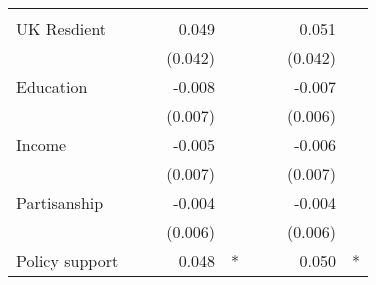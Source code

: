 \documentclass{article}
\begin{document}
\begin{table}[!h]
\begin{tabular}{lllllllll}
  \multicolumn{1}{l}{} \\
\multicolumn{1}{l}{UK Resdient} &
  \multicolumn{1}{r}{} &
  \multicolumn{1}{l}{} &
  \multicolumn{1}{r}{0.049} &
  \multicolumn{1}{l}{} &
  \multicolumn{1}{r}{} &
  \multicolumn{1}{l}{} &
  \multicolumn{1}{r}{0.051} &
  \multicolumn{1}{l}{} \\
\multicolumn{1}{l}{} &
  \multicolumn{1}{r}{} &
  \multicolumn{1}{l}{} &
  \multicolumn{1}{r}{(0.042)} &
  \multicolumn{1}{l}{} &
  \multicolumn{1}{r}{} &
  \multicolumn{1}{l}{} &
  \multicolumn{1}{r}{(0.042)} &
  \multicolumn{1}{l}{} \\
\multicolumn{1}{l}{Education} &
  \multicolumn{1}{r}{} &
  \multicolumn{1}{l}{} &
  \multicolumn{1}{r}{-0.008} &
  \multicolumn{1}{l}{} &
  \multicolumn{1}{r}{} &
  \multicolumn{1}{l}{} &
  \multicolumn{1}{r}{-0.007} &
  \multicolumn{1}{l}{} \\
\multicolumn{1}{l}{} &
  \multicolumn{1}{r}{} &
  \multicolumn{1}{l}{} &
  \multicolumn{1}{r}{(0.007)} &
  \multicolumn{1}{l}{} &
  \multicolumn{1}{r}{} &
  \multicolumn{1}{l}{} &
  \multicolumn{1}{r}{(0.006)} &
  \multicolumn{1}{l}{} \\
\multicolumn{1}{l}{Income} &
  \multicolumn{1}{r}{} &
  \multicolumn{1}{l}{} &
  \multicolumn{1}{r}{-0.005} &
  \multicolumn{1}{l}{} &
  \multicolumn{1}{r}{} &
  \multicolumn{1}{l}{} &
  \multicolumn{1}{r}{-0.006} &
  \multicolumn{1}{l}{} \\
\multicolumn{1}{l}{} &
  \multicolumn{1}{r}{} &
  \multicolumn{1}{l}{} &
  \multicolumn{1}{r}{(0.007)} &
  \multicolumn{1}{l}{} &
  \multicolumn{1}{r}{} &
  \multicolumn{1}{l}{} &
  \multicolumn{1}{r}{(0.007)} &
  \multicolumn{1}{l}{} \\
\multicolumn{1}{l}{Partisanship} &
  \multicolumn{1}{r}{} &
  \multicolumn{1}{l}{} &
  \multicolumn{1}{r}{-0.004} &
  \multicolumn{1}{l}{} &
  \multicolumn{1}{r}{} &
  \multicolumn{1}{l}{} &
  \multicolumn{1}{r}{-0.004} &
  \multicolumn{1}{l}{} \\
\multicolumn{1}{l}{} &
  \multicolumn{1}{r}{} &
  \multicolumn{1}{l}{} &
  \multicolumn{1}{r}{(0.006)} &
  \multicolumn{1}{l}{} &
  \multicolumn{1}{r}{} &
  \multicolumn{1}{l}{} &
  \multicolumn{1}{r}{(0.006)} &
  \multicolumn{1}{l}{} \\
\multicolumn{1}{l}{Policy support} &
  \multicolumn{1}{r}{} &
  \multicolumn{1}{l}{} &
  \multicolumn{1}{r}{0.048} &
  \multicolumn{1}{l}{*} &
  \multicolumn{1}{r}{} &
  \multicolumn{1}{l}{} &
  \multicolumn{1}{r}{0.050} &
  \multicolumn{1}{l}{*} \\

\end{tabular}
\end{table}
\end{document}
